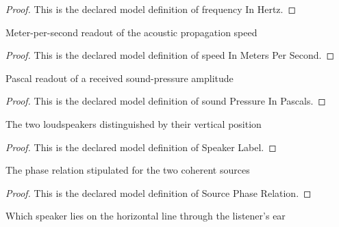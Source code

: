 \begin{proof}
  This is the declared model definition of frequency In Hertz.
\end{proof}
\begin{definition}
  \label{def:physics:phyx-mini-0314:phyxminiproblems-problemphyxmini0314-speedinmeterspersecond}
  Meter-per-second readout of the acoustic propagation speed
\end{definition}
\begin{proof}
  This is the declared model definition of speed In Meters Per Second.
\end{proof}
\begin{definition}
  \label{def:physics:phyx-mini-0314:phyxminiproblems-problemphyxmini0314-soundpressureinpascals}
  Pascal readout of a received sound-pressure amplitude
\end{definition}
\begin{proof}
  This is the declared model definition of sound Pressure In Pascals.
\end{proof}
\begin{definition}
  \label{def:physics:phyx-mini-0314:phyxminiproblems-problemphyxmini0314-speakerlabel}
  The two loudspeakers distinguished by their vertical position
\end{definition}
\begin{proof}
  This is the declared model definition of Speaker Label.
\end{proof}
\begin{definition}
  \label{def:physics:phyx-mini-0314:phyxminiproblems-problemphyxmini0314-sourcephaserelation}
  The phase relation stipulated for the two coherent sources
\end{definition}
\begin{proof}
  This is the declared model definition of Source Phase Relation.
\end{proof}
\begin{definition}
  \label{def:physics:phyx-mini-0314:phyxminiproblems-problemphyxmini0314-listeneralignment}
  Which speaker lies on the horizontal line through the listener's ear
\end{definition}
